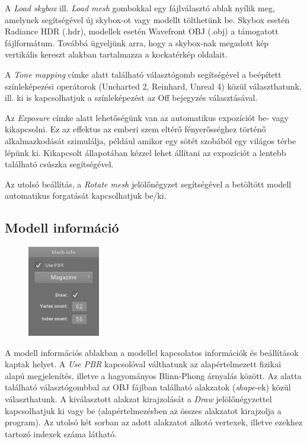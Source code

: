 A \textit{Load skybox} ill. \textit{Load mesh} gombokkal egy fájlválasztó ablak nyílik meg, amelynek segítségével új skybox-ot vagy modellt tölthetünk be. Skybox esetén Radiance HDR (.hdr), modellek esetén Wavefront OBJ (.obj) a támogatott fájlformátum. Továbbá ügyeljünk arra, hogy a skybox-nak megadott kép vertikális kereszt alakban tartalmazza a kockatérkép oldalait.

A \textit{Tone mapping} címke alatt található választógomb segítségével a beépített színleképezési operátorok (Uncharted 2, Reinhard, Unreal 4) közül választhatunk, ill. ki is kapcsolhatjuk a színleképezést az Off bejegyzés választásával.

Az \textit{Exposure} címke alatt lehetőségünk van az automatikus expozíciót be- vagy kikapcsolni. Ez az effektus az emberi szem eltérő fényerősséghez történő alkalmazkodását szimulálja, például amikor egy sötét szobából egy világos térbe lépünk ki. Kikapcsolt állapotában kézzel lehet állítani az expozíciót a lentebb található csúszka segítségével.

Az utolsó beállítás, a \textit{Rotate mesh} jelölőnégyzet segítségével a betöltött modell automatikus forgatását kapcsolhatjuk be/ki.

\clearpage

\subsection{Modell információ}

\begin{figure}
    \vspace{-23pt}
    \includegraphics[width=0.28\textwidth]{images/mesh_info.png}
    \vspace{-20pt}
\end{figure}

A modell információs ablakban a modellel kapcsolatos információk és beállítások kaptak helyet. A \textit{Use PBR} kapcsolóval válthatunk az alapértelmezett fizikai alapú megjelenítés, illetve a hagyományos Blinn-Phong árnyalás között. Az alatta található választógombbal az OBJ fájlban található alakzatok (\textit{shape}-ek) közül választhatunk. A kiválasztott alakzat kirajzolását a \textit{Draw} jelölőnégyzettel kapcsolhatjuk ki vagy be (alapértelmezésben az összes alakzatot kirajzolja a program). Az utolsó két sorban az adott alakzatot alkotó vertexek, illetve ezekhez tartozó indexek száma látható.

